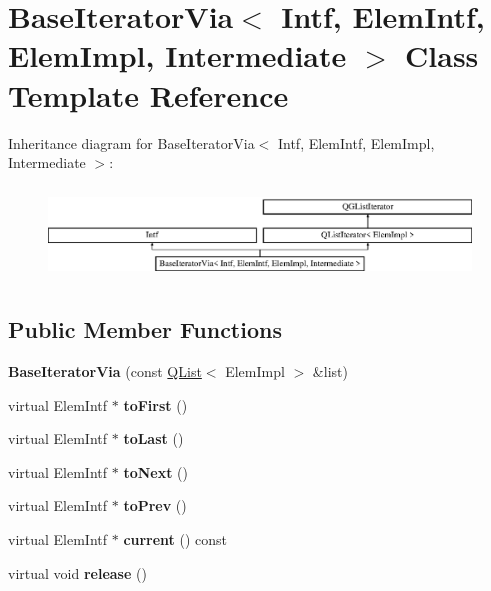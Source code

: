 \hypertarget{class_base_iterator_via}{}\section{Base\+Iterator\+Via$<$ Intf, Elem\+Intf, Elem\+Impl, Intermediate $>$ Class Template Reference}
\label{class_base_iterator_via}
Inheritance diagram for Base\+Iterator\+Via$<$ Intf, Elem\+Intf, Elem\+Impl, Intermediate $>$\+:\begin{figure}[H]
\begin{center}
\leavevmode
\includegraphics[height=2.500000cm]{class_base_iterator_via}
\end{center}
\end{figure}
\subsection*{Public Member Functions}
\begin{DoxyCompactItemize}
\item 
\mbox{\label{class_base_iterator_via_a4fc57902e2cb2cc96ef7fcd0dce60143}} 
{\bfseries Base\+Iterator\+Via} (const \mbox{\hyperlink{class_q_list}{Q\+List}}$<$ Elem\+Impl $>$ \&list)
\item 
\mbox{\label{class_base_iterator_via_a6b265cf402c06e641ae54632d0b5ea39}} 
virtual Elem\+Intf $\ast$ {\bfseries to\+First} ()
\item 
\mbox{\label{class_base_iterator_via_a82c4e31c2ba4ce0fb41688e7033912ba}} 
virtual Elem\+Intf $\ast$ {\bfseries to\+Last} ()
\item 
\mbox{\label{class_base_iterator_via_a76f30bdab292aad42afa107a4639ff6d}} 
virtual Elem\+Intf $\ast$ {\bfseries to\+Next} ()
\item 
\mbox{\label{class_base_iterator_via_aa9ceb9f5c11c005581fefa10a52f28f2}} 
virtual Elem\+Intf $\ast$ {\bfseries to\+Prev} ()
\item 
\mbox{\label{class_base_iterator_via_ad3aa1dabac9ccb40af0595f5a7b9f180}} 
virtual Elem\+Intf $\ast$ {\bfseries current} () const
\item 
\mbox{\label{class_base_iterator_via_a1c6a67fe62ee7fa08576e38e358f2e04}} 
virtual void {\bfseries release} ()
\end{DoxyCompactItemize}
